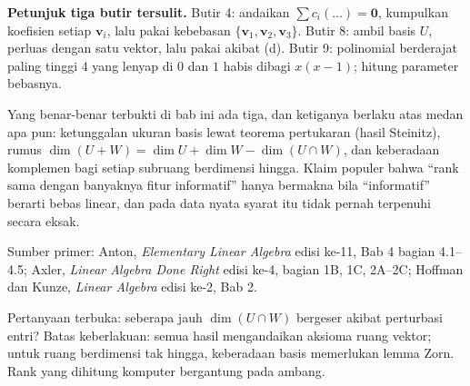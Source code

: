 \begin{latihan}
\noindent\textbf{Petunjuk tiga butir tersulit.} Butir 4: andaikan
$\sum c_{i}(\dots)=\mathbf{0}$, kumpulkan koefisien setiap $\mathbf{v}_{i}$, lalu pakai
kebebasan $\{\mathbf{v}_{1},\mathbf{v}_{2},\mathbf{v}_{3}\}$. Butir 8: ambil basis $U$,
perluas dengan satu vektor, lalu pakai akibat (d). Butir 9: polinomial berderajat paling
tinggi $4$ yang lenyap di $0$ dan $1$ habis dibagi $x(x-1)$; hitung parameter bebasnya.
\end{latihan}

\begin{untukpeneliti}
Yang benar-benar terbukti di bab ini ada tiga, dan ketiganya berlaku atas medan apa pun:
ketunggalan ukuran basis lewat teorema pertukaran (hasil Steinitz), rumus
$\dim(U+W)=\dim U+\dim W-\dim(U\cap W)$, dan keberadaan komplemen bagi setiap subruang
berdimensi hingga. Klaim populer bahwa ``rank sama dengan banyaknya fitur informatif'' hanya
bermakna bila ``informatif'' berarti bebas linear, dan pada data nyata syarat itu tidak pernah
terpenuhi secara eksak.

Sumber primer: Anton, \emph{Elementary Linear Algebra} edisi ke-11, Bab 4 bagian 4.1--4.5;
Axler, \emph{Linear Algebra Done Right} edisi ke-4, bagian 1B, 1C, 2A--2C; Hoffman dan Kunze,
\emph{Linear Algebra} edisi ke-2, Bab 2.

Pertanyaan terbuka: seberapa jauh $\dim(U\cap W)$ bergeser akibat perturbasi entri? Batas
keberlakuan: semua hasil mengandaikan aksioma ruang vektor; untuk ruang berdimensi tak hingga,
keberadaan basis memerlukan lemma Zorn. Rank yang dihitung komputer bergantung pada ambang.
\end{untukpeneliti}

